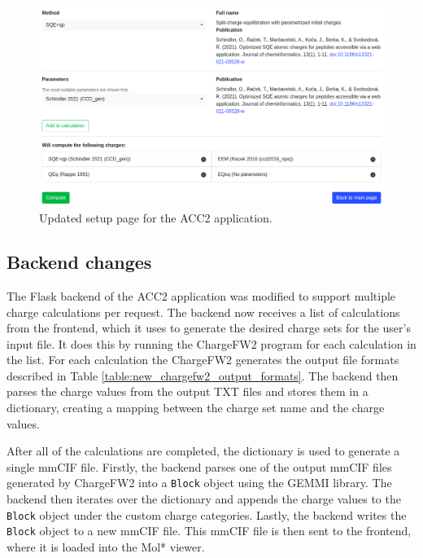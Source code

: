 \documentclass[
  digital,     %
  oneside,     %
  nosansbold,  %
  nocolorbold, %
  lof,         %
  lot,         %
]{fithesis4}
\begin{document}
\begin{figure}[htbp]
  \begin{center}
    \includegraphics[width=\textwidth]{figures/new_setup.png}
  \end{center}
  \caption{Updated setup page for the ACC2 application.}
  \label{fig:new_setup}
\end{figure}

\subsection{Backend changes}

The Flask backend of the ACC2 application was modified to support multiple charge calculations per request. The backend now receives a list of calculations from the frontend, which it uses to generate the desired charge sets for the user's input file. It does this by running the ChargeFW2 program for each calculation in the list. For each calculation the ChargeFW2 generates the output file formats described in Table \ref{table:new_chargefw2_output_formats}. The backend then parses the charge values from the output TXT files and stores them in a dictionary, creating a mapping between the charge set name and the charge values.

After all of the calculations are completed, the dictionary is used to generate a single mmCIF file. Firstly, the backend parses one of the output mmCIF files generated by ChargeFW2 into a \texttt{Block} object using the GEMMI library. The backend then iterates over the dictionary and appends the charge values to the \texttt{Block} object under the custom charge categories. Lastly, the backend writes the \texttt{Block} object to a new mmCIF file. This mmCIF file is then sent to the frontend, where it is loaded into the Mol* viewer.
\end{document}
